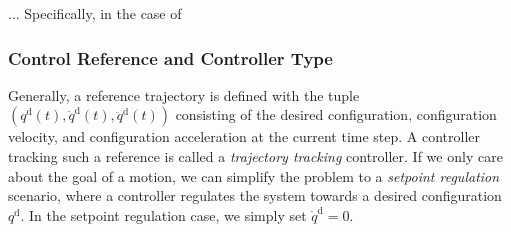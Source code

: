 ...
Specifically, in the case of 

\subsubsection{Control Reference and Controller Type}
Generally, a reference trajectory is defined with the tuple $(q^\mathrm{d}(t), \dot{q}^\mathrm{d}(t), \ddot{q}^\mathrm{d}(t))$ consisting of the desired configuration, configuration velocity, and configuration acceleration at the current time step.
A controller tracking such a reference is called a \emph{trajectory tracking} controller.
If we only care about the goal of a motion, we can simplify the problem to a \emph{setpoint regulation} scenario, where a controller regulates the system towards a desired configuration $q^\mathrm{d}$. In the setpoint regulation case, we simply set $\dot{q}^\mathrm{d} = 0$.

